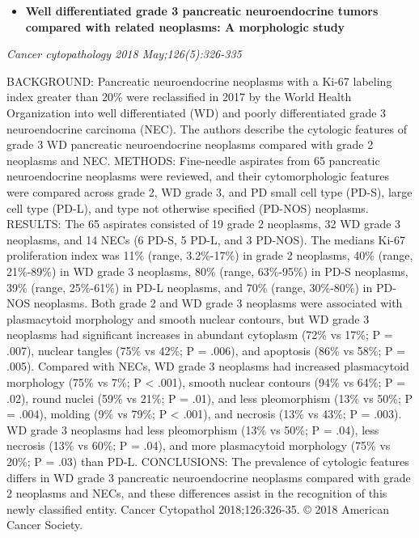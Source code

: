 \documentclass[]{article}
\providecommand{\tightlist}{%
  \setlength{\itemsep}{0pt}\setlength{\parskip}{0pt}}
\begin{document}
\begin{itemize}
\tightlist
\item
  \textbf{Well differentiated grade 3 pancreatic neuroendocrine tumors
  compared with related neoplasms: A morphologic study}
\end{itemize}

\emph{Cancer cytopathology 2018 May;126(5):326-335}

BACKGROUND: Pancreatic neuroendocrine neoplasms with a Ki-67 labeling
index greater than 20\% were reclassified in 2017 by the World Health
Organization into well differentiated (WD) and poorly differentiated
grade 3 neuroendocrine carcinoma (NEC). The authors describe the
cytologic features of grade 3 WD pancreatic neuroendocrine neoplasms
compared with grade 2 neoplasms and NEC. METHODS: Fine-needle aspirates
from 65 pancreatic neuroendocrine neoplasms were reviewed, and their
cytomorphologic features were compared across grade 2, WD grade 3, and
PD small cell type (PD-S), large cell type (PD-L), and type not
otherwise specified (PD-NOS) neoplasms. RESULTS: The 65 aspirates
consisted of 19 grade 2 neoplasms, 32 WD grade 3 neoplasms, and 14 NECs
(6 PD-S, 5 PD-L, and 3 PD-NOS). The medians Ki-67 proliferation index
was 11\% (range, 3.2\%-17\%) in grade 2 neoplasms, 40\% (range,
21\%-89\%) in WD grade 3 neoplasms, 80\% (range, 63\%-95\%) in PD-S
neoplasms, 39\% (range, 25\%-61\%) in PD-L neoplasms, and 70\% (range,
30\%-80\%) in PD-NOS neoplasms. Both grade 2 and WD grade 3 neoplasms
were associated with plasmacytoid morphology and smooth nuclear
contours, but WD grade 3 neoplasms had significant increases in abundant
cytoplasm (72\% vs 17\%; P = .007), nuclear tangles (75\% vs 42\%; P =
.006), and apoptosis (86\% vs 58\%; P = .005). Compared with NECs, WD
grade 3 neoplasms had increased plasmacytoid morphology (75\% vs 7\%; P
\textless{} .001), smooth nuclear contours (94\% vs 64\%; P = .02),
round nuclei (59\% vs 21\%; P = .01), and less pleomorphism (13\% vs
50\%; P = .004), molding (9\% vs 79\%; P \textless{} .001), and necrosis
(13\% vs 43\%; P = .003). WD grade 3 neoplasms had less pleomorphism
(13\% vs 50\%; P = .04), less necrosis (13\% vs 60\%; P = .04), and more
plasmacytoid morphology (75\% vs 20\%; P = .03) than PD-L. CONCLUSIONS:
The prevalence of cytologic features differs in WD grade 3 pancreatic
neuroendocrine neoplasms compared with grade 2 neoplasms and NECs, and
these differences assist in the recognition of this newly classified
entity. Cancer Cytopathol 2018;126:326-35. © 2018 American Cancer
Society.
\end{document}
